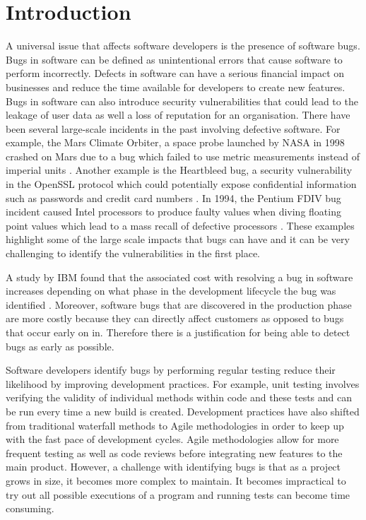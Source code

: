 \documentclass[../main.tex]{subfiles}
\begin{document}
\chapter{Introduction}

A universal issue that affects software developers is the presence of software bugs. Bugs in software can be defined as unintentional errors that cause software to perform incorrectly. Defects in software can have a serious financial impact on businesses and
reduce the time available for developers to create new features. Bugs in software can also introduce security vulnerabilities that could lead to the leakage of user data as well a loss of reputation \cite{briski2008minimizing} for an organisation. There have been several large-scale incidents in the past involving defective software. For example, the Mars Climate Orbiter, a space probe launched by NASA in 1998 crashed on Mars due to a bug which failed to use metric measurements instead of imperial units \cite{sauser2009projects}. Another example is the Heartbleed bug, a security vulnerability in the OpenSSL protocol which could potentially expose confidential information such as passwords and credit card numbers \cite{durumeric2014matter}. In 1994, the Pentium FDIV bug incident caused Intel processors to produce faulty values when diving floating point values which lead to a mass recall of defective processors \cite{pratt1995anatomy}. These examples highlight some of the large scale impacts that bugs can have and it can be very challenging to identify the vulnerabilities in the first place. 

A study by IBM found that the associated cost with resolving a bug in software increases depending on what phase in the development lifecycle the bug was identified \cite{briski2008minimizing}. Moreover, software bugs that are discovered in the production phase are more costly because they can directly affect customers as opposed to bugs that occur early on in. Therefore there is a justification for being able to detect bugs as early as possible. 

Software developers identify bugs by performing regular testing reduce their likelihood by improving development practices. For example, unit testing involves verifying the validity of individual methods within code and these tests and can be run every time a new build is created. Development practices have also shifted from traditional waterfall methods to Agile methodologies in order to keep up with the fast pace of development cycles. Agile methodologies allow for more frequent testing as well as code reviews before integrating new features to the main product. However, a challenge with identifying bugs is that as a project grows in size, it becomes more complex to maintain. It becomes impractical to try out all possible executions of a program and running tests can become time consuming. 
\end{document}
